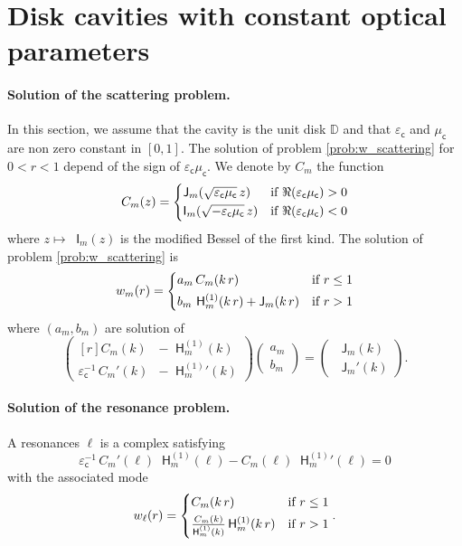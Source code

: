 \documentclass[12pt,a4paper]{article}
\newcommand{\bbD}{\mathbb{D}}
\newcommand{\bJ}{\mathop{}\!\mathsf{J}}
\newcommand{\Hu}{\mathop{}\!\mathsf{H}^{(1)}}
\newcommand{\bI}{\mathop{}\!\mathsf{I}}
\newcommand{\ecav}{\varepsilon_\mathsf{c}}
\newcommand{\mcav}{\mu_\mathsf{c}}
\begin{document}
\section{Disk cavities with constant optical parameters}

\paragraph{Solution of the scattering problem.}
In this section, we assume that the cavity is the unit disk $\bbD$ and that $\ecav$ and $\mcav$ are non zero constant in $[0, 1]$.
The solution of problem \eqref{prob:w_scattering} for $0 < r < 1$ depend of the sign of $\ecav\mcav$.
We denote by $C_m$ the function
\[
    C_m(z) = \begin{dcases}
        \bJ_m(\sqrt{\ecav\mcav}\, z) & \text{if } \Re(\ecav\mcav) > 0\\
        \bI_m(\sqrt{-\ecav\mcav}\, z) & \text{if } \Re(\ecav\mcav) < 0
    \end{dcases}
\]
where $z \mapsto \bI_m(z)$ is the modified Bessel of the first kind.
The solution of problem \eqref{prob:w_scattering} is
\begin{equation}
    w_m(r) = \begin{dcases}
        a_m\, C_m(k\, r) & \text{if } r \le 1\\
        b_m\, \Hu_m(k\, r) + \bJ_m(k\, r) & \text{if } r > 1
    \end{dcases}
\end{equation}
where $(a_m, b_m)$ are solution of
\begin{equation}
    \begin{pmatrix*}[r]
        C_m(k) & -\Hu_m(k)\\[1ex]
        \ecav^{-1}\, C_m'(k) & -{\Hu_m}'(k)
    \end{pmatrix*}
    \begin{pmatrix}
        a_m\\[1ex]
        b_m
    \end{pmatrix} = 
    \begin{pmatrix}
        \bJ_m(k)\\[1ex]
        \bJ_m'(k)
    \end{pmatrix}.
\end{equation}


\paragraph{Solution of the resonance problem.}
A resonances $\ell$ is a complex satisfying
\begin{equation}
    \ecav^{-1}\, C_m'(\ell) \Hu_m(\ell) - C_m(\ell) {\Hu_m}'(\ell) = 0
\end{equation}
with the associated mode
\begin{equation}
    w_\ell(r) = \begin{dcases}
        C_m(k\, r) & \text{if } r \le 1\\
        \tfrac{C_m(k)}{\Hu_m(k)}\Hu_m(k\, r) & \text{if } r > 1
    \end{dcases}.
\end{equation}
\end{document}
